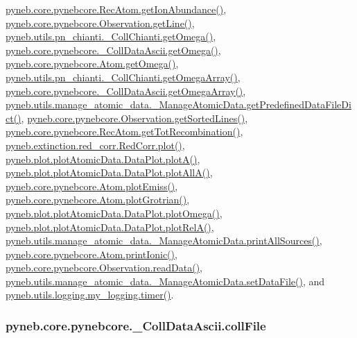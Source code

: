 \hyperlink{pynebcore_8py_source_l03083}{pyneb.\-core.\-pynebcore.\-Rec\-Atom.\-get\-Ion\-Abundance()}, \hyperlink{pynebcore_8py_source_l03665}{pyneb.\-core.\-pynebcore.\-Observation.\-get\-Line()}, \hyperlink{pn__chianti_8py_source_l00507}{pyneb.\-utils.\-pn\-\_\-chianti.\-\_\-\-Coll\-Chianti.\-get\-Omega()}, \hyperlink{pynebcore_8py_source_l01082}{pyneb.\-core.\-pynebcore.\-\_\-\-Coll\-Data\-Ascii.\-get\-Omega()}, \hyperlink{pynebcore_8py_source_l01324}{pyneb.\-core.\-pynebcore.\-Atom.\-get\-Omega()}, \hyperlink{pn__chianti_8py_source_l00484}{pyneb.\-utils.\-pn\-\_\-chianti.\-\_\-\-Coll\-Chianti.\-get\-Omega\-Array()}, \hyperlink{pynebcore_8py_source_l01058}{pyneb.\-core.\-pynebcore.\-\_\-\-Coll\-Data\-Ascii.\-get\-Omega\-Array()}, \hyperlink{manage__atomic__data_8py_source_l00034}{pyneb.\-utils.\-manage\-\_\-atomic\-\_\-data.\-\_\-\-Manage\-Atomic\-Data.\-get\-Predefined\-Data\-File\-Dict()}, \hyperlink{pynebcore_8py_source_l03684}{pyneb.\-core.\-pynebcore.\-Observation.\-get\-Sorted\-Lines()}, \hyperlink{pynebcore_8py_source_l02851}{pyneb.\-core.\-pynebcore.\-Rec\-Atom.\-get\-Tot\-Recombination()}, \hyperlink{red__corr_8py_source_l00303}{pyneb.\-extinction.\-red\-\_\-corr.\-Red\-Corr.\-plot()}, \hyperlink{plot_atomic_data_8py_source_l00117}{pyneb.\-plot.\-plot\-Atomic\-Data.\-Data\-Plot.\-plot\-A()}, \hyperlink{plot_atomic_data_8py_source_l00189}{pyneb.\-plot.\-plot\-Atomic\-Data.\-Data\-Plot.\-plot\-All\-A()}, \hyperlink{pynebcore_8py_source_l02384}{pyneb.\-core.\-pynebcore.\-Atom.\-plot\-Emiss()}, \hyperlink{pynebcore_8py_source_l02443}{pyneb.\-core.\-pynebcore.\-Atom.\-plot\-Grotrian()}, \hyperlink{plot_atomic_data_8py_source_l00373}{pyneb.\-plot.\-plot\-Atomic\-Data.\-Data\-Plot.\-plot\-Omega()}, \hyperlink{plot_atomic_data_8py_source_l00262}{pyneb.\-plot.\-plot\-Atomic\-Data.\-Data\-Plot.\-plot\-Rel\-A()}, \hyperlink{manage__atomic__data_8py_source_l00431}{pyneb.\-utils.\-manage\-\_\-atomic\-\_\-data.\-\_\-\-Manage\-Atomic\-Data.\-print\-All\-Sources()}, \hyperlink{pynebcore_8py_source_l02233}{pyneb.\-core.\-pynebcore.\-Atom.\-print\-Ionic()}, \hyperlink{pynebcore_8py_source_l03711}{pyneb.\-core.\-pynebcore.\-Observation.\-read\-Data()}, \hyperlink{manage__atomic__data_8py_source_l00380}{pyneb.\-utils.\-manage\-\_\-atomic\-\_\-data.\-\_\-\-Manage\-Atomic\-Data.\-set\-Data\-File()}, and \hyperlink{logging_8py_source_l00115}{pyneb.\-utils.\-logging.\-my\-\_\-logging.\-timer()}.

\hypertarget{classpyneb_1_1core_1_1pynebcore_1_1___coll_data_ascii_a8f7186365d566d4de80bf20b41b51c75}{
\subsubsection[{coll\-File}]{\setlength{\rightskip}{0pt plus 5cm}pyneb.\-core.\-pynebcore.\-\_\-\-Coll\-Data\-Ascii.\-coll\-File}}\label{classpyneb_1_1core_1_1pynebcore_1_1___coll_data_ascii_a8f7186365d566d4de80bf20b41b51c75}


